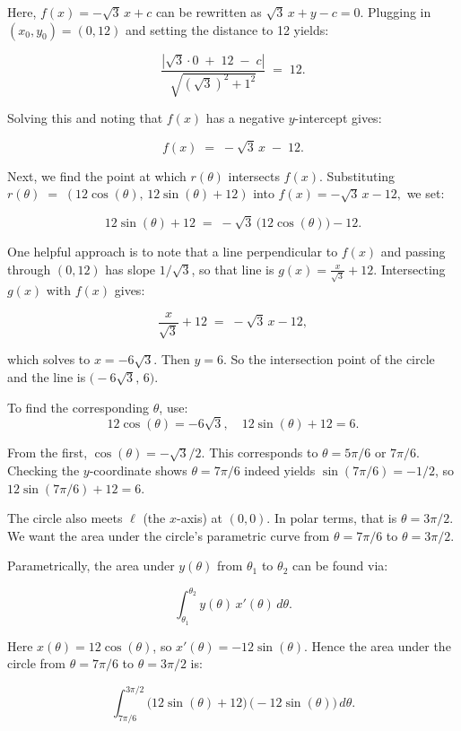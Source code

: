 \begin{enumerate}
 Here, \(f(x) = -\sqrt{3}\,x + c\) can be rewritten as \(\sqrt{3}\,x + y - c = 0.\)  Plugging in \((x_0,y_0)=(0,12)\) and setting the distance to 12 yields:

 
 \[\frac{|\sqrt{3}\cdot 0 \;+\; 12 \;-\; c|}{\sqrt{(\sqrt{3})^2 + 1^2}}\;=\;12.\]

 Solving this and noting that \(f(x)\) has a negative \(y\)-intercept gives:

 
 \[f(x) \;=\; -\sqrt{3}\,x \;-\; 12.\]

 Next, we find the point at which \(r(\theta)\) intersects \(f(x)\).  Substituting \(r(\theta) \;=\; (12\cos(\theta), \,12\sin(\theta) + 12)\) into \(f(x) = -\sqrt{3}\,x - 12,\) we set:

 
 \[12\sin(\theta) + 12 \;=\; -\sqrt{3}\,\bigl(12\cos(\theta)\bigr) - 12.\]

 One helpful approach is to note that a line perpendicular to \(f(x)\) and passing through \((0,12)\) has slope \(1/\sqrt{3}\), so that line is \(g(x) = \frac{x}{\sqrt{3}} + 12.\)  Intersecting \(g(x)\) with \(f(x)\) gives:

 
 \[\frac{x}{\sqrt{3}} + 12 \;=\; -\sqrt{3}\,x - 12,\]

 which solves to \(x = -6\sqrt{3}\).  Then \(y = 6.\)  So the intersection point of the circle and the line is \(\bigl(-6\sqrt{3},\,6\bigr)\).

 To find the corresponding \(\theta\), use: 
 \[12\cos(\theta) = -6\sqrt{3}, \quad12\sin(\theta) + 12 = 6.\]

 From the first, \(\cos(\theta) = -\sqrt{3}/2\).  This corresponds to \(\theta = 5\pi/6\) or \(7\pi/6.\)  Checking the \(y\)-coordinate shows \(\theta = 7\pi/6\) indeed yields \(\sin(7\pi/6) = -1/2\), so \(12\sin(7\pi/6) + 12 = 6.\)

 The circle also meets \(\ell\) (the \(x\)-axis) at \((0,0)\).  In polar terms, that is \(\theta = 3\pi/2\).  We want the area under the circle’s parametric curve from \(\theta=7\pi/6\) to \(\theta=3\pi/2.\)

 Parametrically, the area under \(y(\theta)\) from \(\theta_1\) to \(\theta_2\) can be found via:

 
 \[\int_{\theta_1}^{\theta_2} y(\theta)\,x'(\theta)\,d\theta.\]

 Here \(x(\theta) = 12\cos(\theta)\), so \(x'(\theta) = -12\sin(\theta)\).  Hence the area under the circle from \(\theta = 7\pi/6\) to \(\theta = 3\pi/2\) is:

 
 \[\int_{7\pi/6}^{3\pi/2} \bigl(12\sin(\theta) + 12\bigr) \,\bigl(-12\sin(\theta)\bigr)\,d\theta.\]


\end{enumerate}
